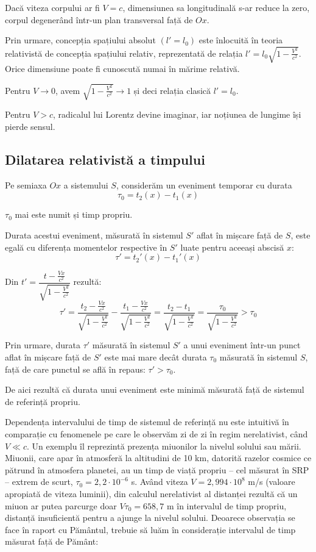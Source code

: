\documentclass[a4paper, 12pt]{article}
\newcommand{\parbreak}{\vspace{1cm}}
\newcommand{\lorentzradical}{\sqrt{1 - \frac{V^2}{c^2}}}
\begin{document}
Dacă viteza corpului ar fi \( V = c \), dimensiunea sa longitudinală s-ar reduce
la zero, corpul degenerând într-un plan transversal față de $Ox$.

Prin urmare, concepția spațiului absolut \( \left( l' = l_0 \right) \) este
înlocuită în teoria relativistă de concepția spațiului relativ, reprezentată
de relația \( l' = l_0 \lorentzradical \). Orice dimensiune poate fi cunoscută
numai în mărime relativă.

Pentru \( V \rightarrow 0 \), avem \( \lorentzradical \rightarrow 1 \) și deci
relația clasică \( l' = l_0 \).

Pentru \( V > c \), radicalul lui Lorentz devine imaginar, iar noțiunea de lungime
își pierde sensul.

\subsection{Dilatarea relativistă a timpului}
Pe semiaxa $Ox$ a sistemului $S$, considerăm un eveniment temporar cu durata
\[ \tau_0 = t_2(x) - t_1(x) \]

$\tau_0$ mai este numit și timp propriu.

Durata acestui eveniment, măsurată în sistemul $S'$ aflat în mișcare față de
$S$, este egală cu diferența momentelor respective în $S'$ luate pentru aceeași
abscisă $x$:
\[ \tau' = t_2'(x) - t_1'(x) \]

Din \( t' = \dfrac{t - \frac{Vx}{c^2}}{\lorentzradical} \) rezultă:
\[
    \tau'
    = \frac{t_2 - \frac{Vx}{c^2}}{\lorentzradical}
    - \frac{t_1 - \frac{Vx}{c^2}}{\lorentzradical}
    = \frac{t_2 - t_1}{\lorentzradical} = \frac{\tau_0}{\lorentzradical} > \tau_0
\]

Prin urmare, durata $\tau'$ măsurată în sistemul $S'$ a unui eveniment într-un
punct aflat în mișcare față de $S'$ este mai mare decât durata $\tau_0$
măsurată în sistemul $S$, față de care punctul se află în repaus:
\( \tau' > \tau_0 \).

De aici rezultă că durata unui eveniment este minimă măsurată față de sistemul
de referință propriu.

\parbreak

Dependența intervalului de timp de sistemul de referință nu este intuitivă în
comparație cu fenomenele pe care le observăm zi de zi în regim nerelativist,
când \( V \ll c \).  Un exemplu îl reprezintă prezența miuonilor la nivelul
solului sau mării. Miuonii, care apar în atmosferă la altitudini de 10 km,
datorită razelor cosmice ce pătrund în atmosfera planetei, au un timp de viață
propriu -- cel măsurat în SRP -- extrem de scurt, \( \tau_0 = 2,2 \cdot 10^{-6} \)
s. Având viteza \( V = 2,994 \cdot 10^8 \) m/s (valoare apropiată de viteza
luminii), din calculul nerelativist al distanței rezultă că un miuon ar putea
parcurge doar \( V\tau_0 = 658,7 \) m în intervalul de timp propriu, distanță
insuficientă pentru a ajunge la nivelul solului.  Deoarece observația se face
în raport cu Pământul, trebuie să luăm în considerație intervalul de timp
măsurat față de Pământ:
\end{document}
